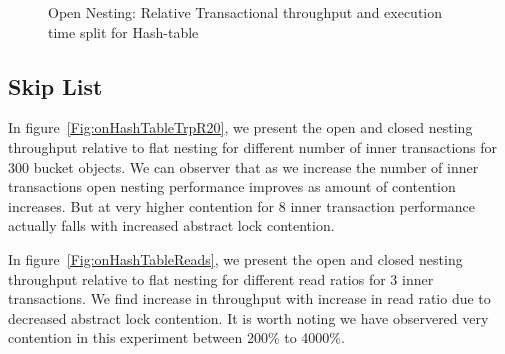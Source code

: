 \documentclass[12pt,english]{report}
\begin{document}
\begin{figure}[H]
\centering
{}
\end{figure}
\begin{figure}[H]
\centering
{}
\end{figure}
\begin{figure}[H]
\centering
{}
\end{figure}
\begin{figure}[H]
\centering
{}
\caption{Open Nesting: Relative Transactional throughput and execution time split for Hash-table}
\label{Fig:cpHashTable}
\end{figure}

\subsection{Skip List}

In figure~\ref{Fig:onHashTableTrpR20}, we present the open and closed nesting throughput relative to flat nesting for different number of inner transactions for 300 bucket objects. We can observer that as we increase the number of inner transactions open nesting performance improves as amount of contention increases. But at very higher contention for 8 inner transaction performance actually falls with increased abstract lock contention. 

In figure~\ref{Fig:onHashTableReads}, we present the open and closed nesting throughput relative to flat nesting for different read ratios for 3 inner transactions. We find increase in throughput with increase in read ratio due to decreased abstract lock contention. It is worth noting we have observered very contention in this experiment between 200\% to 4000\%. 
\end{document}
